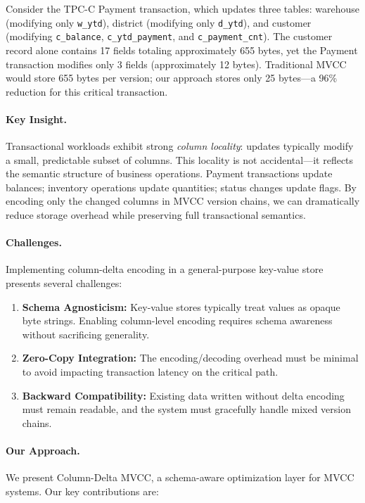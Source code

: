 \documentclass[letterpaper,twocolumn,10pt]{article}
\begin{document}
Consider the TPC-C Payment transaction, which updates three tables: warehouse (modifying only \texttt{w\_ytd}), district (modifying only \texttt{d\_ytd}), and customer (modifying \texttt{c\_balance}, \texttt{c\_ytd\_payment}, and \texttt{c\_payment\_cnt}). The customer record alone contains 17 fields totaling approximately 655 bytes, yet the Payment transaction modifies only 3 fields (approximately 12 bytes). Traditional MVCC would store 655 bytes per version; our approach stores only 25 bytes---a 96\% reduction for this critical transaction.

\paragraph{Key Insight.} Transactional workloads exhibit strong \textit{column locality}: updates typically modify a small, predictable subset of columns. This locality is not accidental---it reflects the semantic structure of business operations. Payment transactions update balances; inventory operations update quantities; status changes update flags. By encoding only the changed columns in MVCC version chains, we can dramatically reduce storage overhead while preserving full transactional semantics.

\paragraph{Challenges.} Implementing column-delta encoding in a general-purpose key-value store presents several challenges:

\begin{enumerate}
\item \textbf{Schema Agnosticism:} Key-value stores typically treat values as opaque byte strings. Enabling column-level encoding requires schema awareness without sacrificing generality.

\item \textbf{Zero-Copy Integration:} The encoding/decoding overhead must be minimal to avoid impacting transaction latency on the critical path.

\item \textbf{Backward Compatibility:} Existing data written without delta encoding must remain readable, and the system must gracefully handle mixed version chains.
\end{enumerate}

\paragraph{Our Approach.} We present Column-Delta MVCC, a schema-aware optimization layer for MVCC systems. Our key contributions are:
\end{document}
